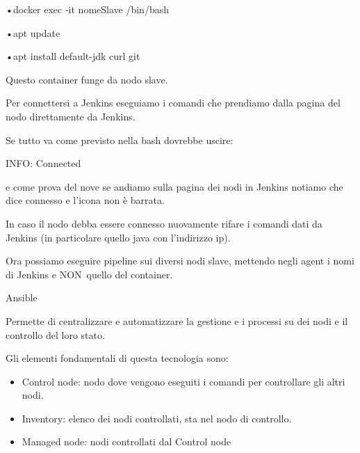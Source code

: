 \documentclass[
]{article}
\providecommand{\tightlist}{%
  \setlength{\itemsep}{0pt}\setlength{\parskip}{0pt}}
\begin{document}
{•docker exec -it nomeSlave /bin/bash}

{•apt update}

{•apt install default-jdk curl git}

{}

{Questo container funge da nodo slave.}

{Per connettersi a Jenkins eseguiamo i comandi che prendiamo dalla
pagina del nodo direttamente da Jenkins.}

{Se tutto va come previsto nella bash dovrebbe uscire:}

{INFO: Connected}

{e come prova del nove se andiamo sulla pagina dei nodi in Jenkins
notiamo che dice connesso e l'icona non è barrata.}

{}

{In caso il nodo debba essere connesso nuovamente rifare i comandi dati
da Jenkins (in particolare quello java con l'indirizzo ip).}

{}

{}

{Ora possiamo eseguire pipeline sui diversi nodi slave, mettendo }{negli
agent i nomi di Jenkins }{e NON}{~quello del container}{.}

{}

{}

{Ansible}

{Permette di centralizzare e automatizzare la gestione e i processi su
dei nodi e il controllo del loro stato.}

{}

{Gli elementi fondamentali di questa tecnologia sono:}

\begin{itemize}
\tightlist
\item
  {Control node}{: nodo dove vengono eseguiti i comandi per controllare
  gli altri nodi.}
\end{itemize}

\begin{itemize}
\tightlist
\item
  {Inventory}{: elenco dei nodi controllati, sta nel nodo di controllo.}
\end{itemize}

\begin{itemize}
\tightlist
\item
  {Managed node}{: nodi controllati dal Control node}
\end{itemize}

{}
\end{document}
